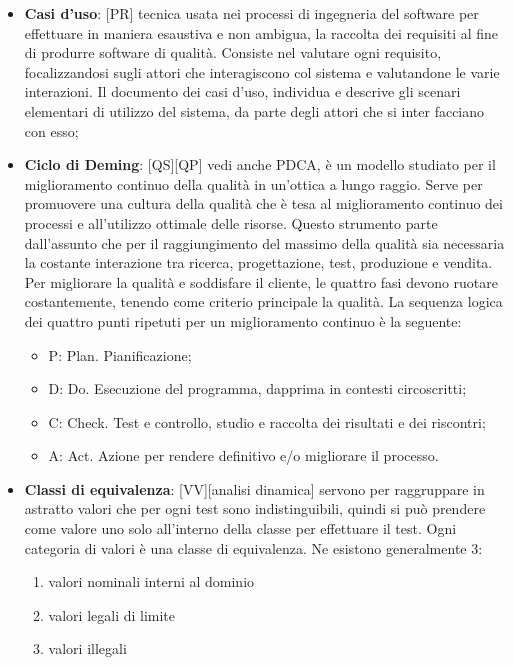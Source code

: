	\begin{itemize}
		\item \textbf{Casi d'uso}: [PR] tecnica usata nei processi di ingegneria del software per effettuare in maniera esaustiva e non ambigua, la raccolta dei requisiti al fine di produrre software di qualità. Consiste nel valutare ogni requisito, focalizzandosi sugli attori che interagiscono col sistema e valutandone le varie interazioni. Il documento dei casi d’uso, individua e descrive gli scenari elementari di utilizzo del sistema, da parte degli attori che si inter facciano con esso;

		\item \textbf{Ciclo di Deming}: [QS][QP] vedi anche PDCA, è un modello studiato per il miglioramento continuo della qualità in un’ottica a lungo raggio. Serve per promuovere una cultura della qualità che è tesa al miglioramento continuo dei processi e all’utilizzo ottimale delle risorse. Questo strumento parte dall’assunto che per il raggiungimento del massimo della qualità sia necessaria la costante interazione tra ricerca, progettazione, test, produzione e vendita. \newline
	Per migliorare la qualità e soddisfare il cliente, le quattro fasi devono ruotare costantemente, tenendo come criterio principale la qualità.
	La sequenza logica dei quattro punti ripetuti per un miglioramento continuo è la seguente:
		\begin{itemize}
			\item P: Plan. Pianificazione;
			\item D: Do. Esecuzione del programma, dapprima in contesti circoscritti;
			\item C: Check. Test e controllo, studio e raccolta dei risultati e dei riscontri;
			\item A: Act. Azione per rendere definitivo e/o migliorare il processo.
		\end{itemize}

		\item \textbf{Classi di equivalenza}: [VV][analisi dinamica] servono per raggruppare in astratto valori che per ogni test sono indistinguibili, quindi si può prendere come valore uno solo all'interno della classe per effettuare il test. Ogni categoria di valori è una classe di equivalenza. Ne esistono generalmente 3:
			\begin{enumerate}
				\item valori nominali interni al dominio
				\item valori legali di limite
				\item valori illegali
			\end{enumerate}


\end{itemize}
